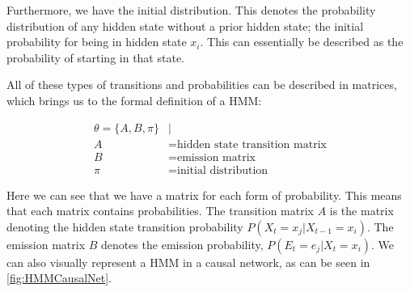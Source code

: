 Furthermore, we have the initial distribution. This denotes the probability distribution of any hidden state without a prior hidden state; the initial probability for being in hidden state $x_i$. This can essentially be described as the probability of starting in that state.

All of these types of transitions and probabilities can be described in matrices, which brings us to the formal definition of a HMM:

\begin{align*}
\theta = \{A,B,\pi\} &|\\
A &= \text{hidden state transition matrix}\\
B &= \text{emission matrix}\\
\pi &= \text{initial distribution}
\end{align*}

Here we can see that we have a matrix for each form of probability. This means that each matrix contains probabilities. The transition matrix $A$ is the matrix denoting the hidden state transition probability $P(X_t=x_j|X_{t-1}=x_i)$. The emission matrix $B$ denotes the emission probability, $P(E_t=e_j|X_t=x_i)$. We can also visually represent a HMM in a causal network, as can be seen in \cref{fig:HMMCausalNet}.

